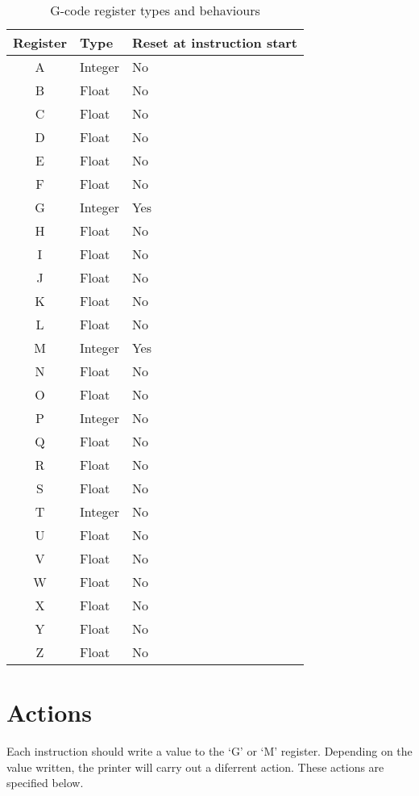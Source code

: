			\begin{table}[H]
				\centering
				\begin{tabular}{c l l}
					\toprule
					Register & Type & Reset at instruction start \\
					\midrule
						A & Integer & No  \\
						B & Float   & No  \\
						C & Float   & No  \\
						D & Float   & No  \\
						E & Float   & No  \\
						F & Float   & No  \\
						G & Integer & Yes \\
						H & Float   & No  \\
						I & Float   & No  \\
						J & Float   & No  \\
						K & Float   & No  \\
						L & Float   & No  \\
						M & Integer & Yes \\
						N & Float   & No  \\
						O & Float   & No  \\
						P & Integer & No  \\
						Q & Float   & No  \\
						R & Float   & No  \\
						S & Float   & No  \\
						T & Integer & No  \\
						U & Float   & No  \\
						V & Float   & No  \\
						W & Float   & No  \\
						X & Float   & No  \\
						Y & Float   & No  \\
						Z & Float   & No  \\
					\bottomrule
				\end{tabular}
				
				\caption{G-code register types and behaviours}
				\label{tab:gcoderegisters}
			\end{table}
	
	\section{Actions}
		
		\label{sec:gcodeactions}
		
		Each instruction should write a value to the `G' or `M' register. Depending
		on the value written, the printer will carry out a diferrent action. These
		actions are specified below.
		

